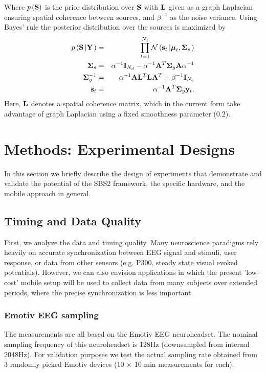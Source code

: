 \documentclass[10pt]{article}
\newcommand{\bm}[1]{\boldsymbol{#1}}
\def\Npdf{{\mathcal N}}		\def\Gpdf{{\mathcal G}}		\def\Wpdf{{\mathcal W}}		\def\L{{\mathcal L}}		\def\F{{\mathcal F}}
\begin{document}
Where $p \left( {\bf S} \right) $ is the prior distribution over $\bf S$ with $\bf L$ given as a graph Laplacian ensuring spatial coherence between sources, and $\beta^{-1}$ as the noise variance. Using Bayes' rule the posterior distribution over the sources is maximized by
\begin{eqnarray}\label{eq:MNsolution}
p \left( {{\bf S} \left| {\bf Y} \right. } \right) &=& { \prod_{t=1}^{N_t} {\Npdf} \left( {{\bf s}_t \left| {{\bm \mu}_t ,{\bf \Sigma }_{s} } \right.} \right)} \nonumber \\
{\bf \Sigma }_{s} &=& \alpha^{-1} {\bf I}_{N_d} - \alpha^{-1} {\bf A}^T {\bf \Sigma}_{y} {\bf A} \alpha^{-1}  \nonumber \\
{\bf \Sigma }_{y}^{-1}  &=&  {\alpha ^{ - 1} {\bf A}{\bf L}^{T}{\bf L}{\bf A}^{T}  + \beta ^{ - 1} {\bf I}_{N_c } }   \\
 {\bar{{\bf s}}_t}  &=& \alpha ^{ - 1} {\bf A}^{T} {\bf \Sigma }_{y} {\bf y}_t .
\end{eqnarray}
Here, $\bf L$ denotes a spatial coherence matrix, which in the current form take advantage of graph Laplacian using a fixed smoothness parameter ($0.2$).  \section{Methods: Experimental Designs}
In this section we briefly describe the design of experiments that demonstrate and validate the potential of the SBS2 framework, the specific hardware, and the mobile approach in general.

	\subsection{Timing and Data Quality}

First, we analyze the data and timing quality. Many neuroscience paradigms rely heavily on accurate synchronization between EEG signal and stimuli, user response, or data from other sensors (e.g. P300, steady state visual evoked potentials). However, we can also envision applications in which the present 'low-cost' mobile setup will be used to collect data from many subjects over extended periods, where the precise synchronization is less important.

		\subsubsection{Emotiv EEG sampling}
The measurements are all based on the Emotiv EEG neuroheadset. The nominal sampling frequency of this neuroheadset is 128Hz (downsampled from internal 2048Hz). For validation purposes we test the actual sampling rate obtained from 3 randomly picked Emotiv devices (10 $\times$ 10 min measurements for each).
\end{document}
